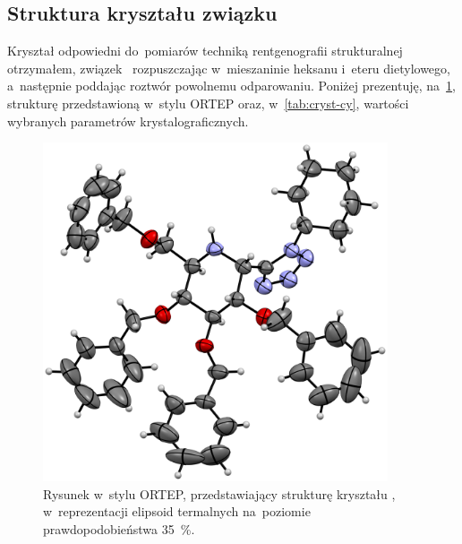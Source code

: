 \pagebreak
\subsection{Struktura kryształu związku }
Kryształ odpowiedni do~pomiarów techniką rentgenografii strukturalnej otrzymałem,
  związek~ rozpuszczając w~mieszaninie heksanu i~eteru dietylowego,
  a~następnie poddając roztwór powolnemu odparowaniu.
Poniżej prezentuję, na~\cref{fig:cryst-cy}, strukturę przedstawioną w~stylu ORTEP
  oraz, w~\cref{tab:cryst-cy}, wartości wybranych parametrów krystalograficznych.

\begin{figure}[h]
    \includegraphics[height=100mm]{sugars/xray-glu-tet-cy-full.eps}
    \caption{
      Rysunek w~stylu ORTEP, przedstawiający strukturę kryształu ,
        w~reprezentacji elipsoid termalnych na~poziomie prawdopodobieństwa \SI{35}{\percent}.
      }
    \label{fig:cryst-cy}
\end{figure}

